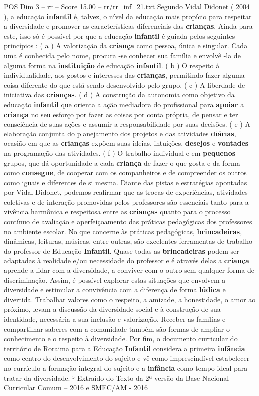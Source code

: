 \begin{textsample}{POS Dim 3 – rr – Score 15.00 – rr/rr\_inf\_21.txt}
Segundo Vidal Didonet ( 2004 ), a educação \textbf{infantil} é, talvez, o nível da educação mais propício para respeitar a diversidade e promover as características diferenciais das \textbf{crianças}.
Ainda para este, isso só é possível por que a educação \textbf{infantil} é guiada pelos seguintes princípios : ( a ) A valorização da \textbf{criança} como pessoa, única e singular.
Cada uma é conhecida pelo nome, procura -se conhecer sua família e envolvê -la de alguma forma na \textbf{instituição} de educação \textbf{infantil}. ( b ) O respeito à individualidade, aos gostos e interesses das \textbf{crianças}, permitindo fazer alguma coisa diferente do que está sendo desenvolvido pelo grupo. ( c ) A liberdade de iniciativa das \textbf{crianças}. ( d ) A construção da autonomia como objetivo da educação \textbf{infantil} que orienta a ação mediadora do profissional para \textbf{apoiar} a \textbf{criança} no seu esforço por fazer as coisas por conta própria, de pensar e ter consciência de suas ações e assumir a responsabilidade por suas decisões. ( e ) A elaboração conjunta do planejamento dos projetos e das atividades \textbf{diárias}, ocasião em que as \textbf{crianças} expõem suas ideias, intuições, \textbf{desejos} e \textbf{vontades} na programação das atividades. ( f ) O trabalho individual e em \textbf{pequenos} grupos, que dá oportunidade a cada \textbf{criança} de fazer o que gosta e da forma como \textbf{consegue}, de cooperar com os companheiros e de compreender os outros como iguais e diferentes de si mesma.
Diante das pistas e estratégias apontadas por Vidal Didonet, podemos reafirmar que as trocas de experiências, atividades coletivas e de interação promovidas pelos professores são essenciais tanto para a vivência harmônica e respeitosa entre as \textbf{crianças} quanto para o processo contínuo de avaliação e aperfeiçoamento das práticas pedagógicas dos professores no ambiente escolar.
No que concerne às práticas pedagógicas, \textbf{brincadeiras}, dinâmicas, leituras, músicas, entre outras, são excelentes ferramentas de trabalho do professor de Educação \textbf{Infantil}.
Quase todas as \textbf{brincadeiras} podem ser adaptadas à realidade e/ou necessidade do professor e é através delas a \textbf{criança} aprende a lidar com a diversidade, a conviver com o outro sem qualquer forma de discriminação.
Assim, é possível explorar estas situações que envolvem a diversidade e estimular a convivência com a diferença de forma \textbf{lúdica} e divertida.
Trabalhar valores como o respeito, a amizade, a honestidade, o amor ao próximo, levam a discussão da diversidade social e à construção de sua identidade, necessária a sua inclusão e valorização.
Receber as famílias e compartilhar saberes com a comunidade também são formas de ampliar o conhecimento e o respeito à diversidade.
Por fim, o documento curricular do território de Roraima para a Educação \textbf{Infantil} considera a primeira \textbf{infância} como centro do desenvolvimento do sujeito e vê como imprescindível estabelecer no currículo a formação integral do sujeito e a \textbf{infância} como tempo ideal para tratar da diversidade. ⁵ Extraído do Texto da 2ª versão da Base Nacional Curricular Comum – 2016 e SMEC/AM - 2016


\end{textsample}

